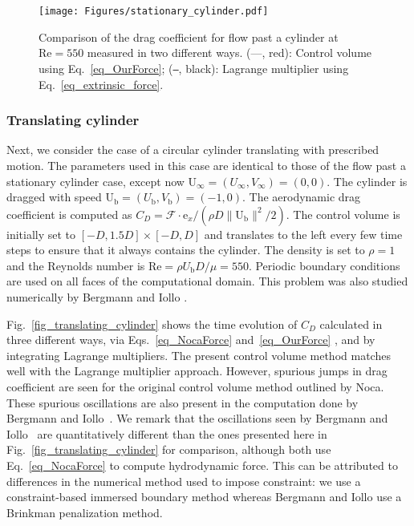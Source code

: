 \documentclass[review]{elsarticle}
\renewcommand{\vec}[1]{\bm{\mathrm{#1}}}
\def \e{\vec{e}}
\def \U{\vec{U}}
\def \cF{\vec{\mathcal{F}}}
\def \U{\vec{U}}
\def \Ub{\U_{\text{b}}}
\def \e{\vec{e}}
\def \Re{\text{Re}}
\newcommand{\REVIEW}[1]{{#1}}
\begin{document}
\begin{figure}[H]
  \centering
    \texttt{[image: Figures/stationary\_cylinder.pdf]}
  \caption{Comparison of the drag coefficient for flow past a
    cylinder at $\Re = 550$ measured in two different ways.
    (---, red): Control volume using Eq.~\eqref{eq_OurForce};
     (\texttt{---}, black): Lagrange multiplier using Eq.~\eqref{eq_extrinsic_force}.}
  \label{fig_stationary_cylinder}
\end{figure}

\subsubsection{Translating cylinder}

Next, we consider the case of a circular cylinder translating with 
prescribed motion. The parameters used in this case are identical 
to those of the flow past a stationary cylinder case, except now 
$\U_{\infty} = (U_{\infty}, V_{\infty})=(0,0)$. The cylinder is dragged 
with speed $\Ub = (U_\text{b}, V_\text{b}) = (-1,0)$. The aerodynamic 
drag coefficient is computed as $C_D = \cF \cdot \e_x/(\rho D \|\Ub\|^2/2)$. 
The control volume is initially set to $[-D, 1.5D] \times [-D, D]$ and 
translates to the left every few time steps to ensure that it always 
contains the cylinder. The density is set to $\rho = 1$ and the 
Reynolds number is $\Re = \rho U_\text{b} D / \mu = 550$.
Periodic boundary conditions are used on all faces of the computational domain.
This problem was also studied numerically by Bergmann and Iollo \cite{Bergmann11}.

Fig.~\ref{fig_translating_cylinder} shows the time evolution of $C_D$ 
calculated in three different ways, via Eqs.~\eqref{eq_NocaForce} and~\eqref{eq_OurForce}
, and by integrating Lagrange multipliers. The present control volume method
matches well with the Lagrange multiplier approach. However, spurious 
jumps in drag coefficient are seen for the original control volume method
outlined by Noca. These spurious oscillations are also present in the computation
done by Bergmann and Iollo~\cite{Bergmann11}. \REVIEW{We remark that the oscillations 
seen by Bergmann and Iollo~\cite{Bergmann11} are quantitatively different than the 
ones presented here in Fig.~\ref{fig_translating_cylinder} for comparison, although both
use Eq.~\eqref{eq_NocaForce} to compute hydrodynamic force. 
This can be attributed to differences in the numerical method used to impose 
constraint: we use a constraint-based immersed boundary method whereas 
Bergmann and Iollo use a Brinkman penalization method.}
\end{document}
